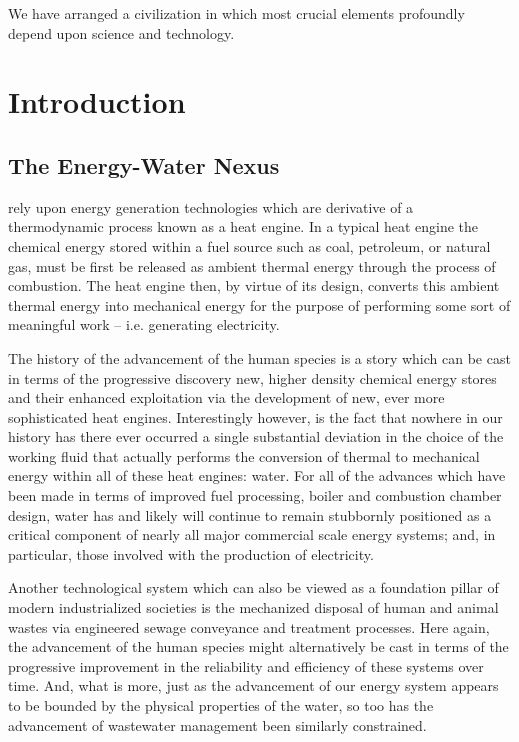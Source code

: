 \begin{savequote}[75mm]
We have arranged a civilization in which most crucial elements profoundly depend upon science and technology.
\end{savequote}

\chapter{Introduction}
\label{Introduction}

\newpage

\section{The Energy-Water Nexus}
  
 rely upon energy generation technologies which are derivative of a thermodynamic process known as a heat engine. In a typical heat engine the chemical energy stored within a fuel source such as coal, petroleum, or natural gas, must be first be released as ambient thermal energy through the process of combustion. The heat engine then, by virtue of its design, converts this ambient thermal energy into mechanical energy for the purpose of performing some sort of meaningful work -- i.e. generating electricity.
    
    The history of the advancement of the human species is a story which can be cast in terms of the progressive discovery new, higher density chemical energy stores and their enhanced exploitation via the development of new, ever more sophisticated heat engines. Interestingly however, is the fact that nowhere in our history has there ever occurred a single substantial deviation in the choice of the working fluid that actually performs the conversion of thermal to mechanical energy within all of these heat engines: water. For all of the advances which have been made in terms of improved fuel processing, boiler and combustion chamber design, water has and likely will continue to remain stubbornly positioned as a critical component of nearly all major commercial scale energy systems; and, in particular, those involved with the production of electricity. 
    
    Another technological system which can also be viewed as a foundation pillar of modern industrialized societies is the mechanized disposal of human and animal wastes via engineered sewage conveyance and treatment processes. Here again, the advancement of the human species might alternatively be cast in terms of the progressive improvement in the reliability and efficiency of these systems over time. And, what is more, just as the advancement of our energy system appears to be bounded by the physical properties of the water, so too has the advancement of wastewater management been similarly constrained. 
        
